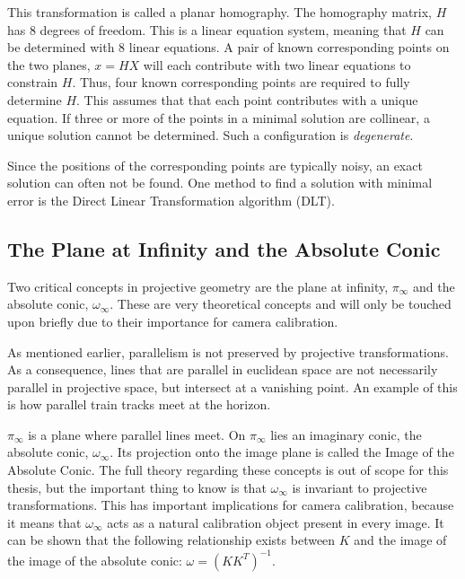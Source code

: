 This transformation is called a planar homography. The homography matrix, $H$ has 8 degrees of freedom. 
This is a linear equation system, meaning that $H$ can be determined with 8 linear equations.
A pair of known corresponding points on the two planes, $x=HX$ will each contribute with two linear equations to constrain $H$.
Thus, four known corresponding points are required to fully determine $H$.
This assumes that that each point contributes with a unique equation.
If three or more of the points in a minimal solution are collinear, a unique solution cannot be determined.
Such a configuration is \textit{degenerate}. \cite[91-92]{hartley-zisserman}

Since the positions of the corresponding points are typically noisy, an exact solution can often not be found.
One method to find a solution with minimal error is the Direct Linear Transformation algorithm (DLT). \cite{homography-estimation}

\subsection{The Plane at Infinity and the Absolute Conic} \label{ac}
Two critical concepts in projective geometry are the plane at infinity, $\pi_{\infty}$ and the absolute conic, $\omega_{\infty}$.
These are very theoretical concepts and will only be touched upon briefly due to their importance for camera calibration.

As mentioned earlier, parallelism is not preserved by projective transformations. 
As a consequence, lines that are parallel in euclidean space are not necessarily parallel in projective space, but intersect at a vanishing point.
An example of this is how parallel train tracks meet at the horizon.

$\pi_{\infty}$ is a plane where parallel lines meet. 
On $\pi_{\infty}$ lies an imaginary conic, the absolute conic, $\omega_{\infty}$.
Its projection onto the image plane is called the Image of the Absolute Conic.
The full theory regarding these concepts is out of scope for this thesis, but the important thing to know is that $\omega_{\infty}$ is invariant to projective transformations.
This has important implications for camera calibration, because it means that $\omega_{\infty}$ acts as a natural calibration object present in every image.
It can be shown that the following relationship exists between $K$ and the image of the image of the absolute conic:
$\omega = (KK^T)^{-1}$. \cite[210]{hartley-zisserman}\cite{pollefeys}

